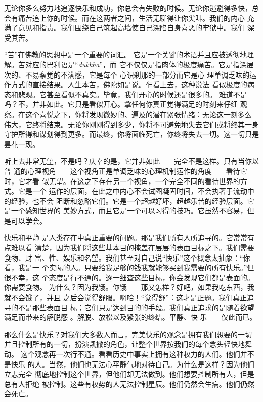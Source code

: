 无论你多么努力地追逐快乐和成功，你总会有失败的时候。无论你逃避得多快，总
会有痛苦追上你的时候。而在这两者之间，生活\1无聊得让你尖叫。我们的内心
充满了意见和指责。我们围绕自己筑起高墙使自己深陷自身喜恶的牢狱中。我们
深受其苦。

“苦”在佛教的思想中是一个重要的词汇。
它是一个关键的术语并且应被透彻地理解。苦对应的巴利语是“{\it dukkha}\/”，而
它不仅仅是指肉体的极度痛苦。它是指深层次的、不易察觉的不满感，它是每个
心识刹那的一部分而它是心
理单调乏味的运作方式的直接结果。人生本苦，佛陀如是说。乍看上去，这种说法
看似极度的病态和悲观。它甚至看似不真实。毕竟，我们开心的时候还是很多的。
难道不是吗？不，并非如此。它只是看似开心。拿任何你真正觉得满足的时刻来仔细
观察。在这个喜悦之下，你将发现微妙的、遍及的潜在紧张情绪：无论这一刻多么
伟大，它终将结束。无论你刚刚得到多少，你将不可避免地失去它们或将终其一身
守护所得和谋划得到更多。而最终，你将面临死亡，你终将失去一切。这一切只是
昙花一现。

听上去非常无望，不是吗？庆幸的是，它并非如此——完全不是这样。只有当你以普
通的心理视角——这个视角正是单调乏味的心理机制运作的角度——看待它时，它才看
似无望。在这之下存在另一个视角，一个完全不同的看待世界的方式。它是一个
运作的层面，在此之中内心不会试图凝固时间，不会执著于流动中的经验，也不会
阻断和忽略它们。它是一个超越好坏，超越乐苦的经验层面。它是一个感知世界的
美妙方式，而且它是一个可以习得的技巧。它虽然不容易，但是可以学会。

快乐和平静
是人类存在中真正重要的问题。那是我们所有人所追寻的。它常常有点难以\1看
清楚，因为我们将这些基本目的掩盖在层层的表面目标之下。我们需要食物、财
富、性、娱乐和名望。我们甚至对自己说“快乐”这个概念太抽象：“你看，我是一
个实际的人。只要给我足够的钱我就能够买到我需要的所有快乐。”但很不幸，这
个态度是行不通的。逐一细查这些目标，你会发现它们都是表面的。你需要食物。
为什么？因为我饿。你饿——那又怎样？好吧，如果我吃东西，我就不会饿了，并且
之后会觉得舒服。啊哈！“觉得舒”：这才是正题。我们真正追寻的不是那些表面目
标；它们只是达到目的的手段。我们真正追求的是随着欲望满足而带来的解脱感
。解脱、放松以及紧张的终结。平静、快
乐——仅此而已。

那么什么是快乐？对我们大多数人而言，完美快乐的观念是拥有我们想要的一切
并且控制所有的一切，扮演凯撒的角色，让整个世界按我们的每个念头轻快地舞动。
这个观念再一次行不通。看看历史中事实上拥有这种权力的人们。他们并不是快乐
的人。当然，他们也无法心平静气地对待自己。为什么是这样？因为他们立志完全
彻底地控制这个世界，但他们却无法做到。他们想要控制所有人，但是总有人拒绝
被控制。这些有权势的人无法控制星辰。他们仍然会生病。他们仍然会死亡。

